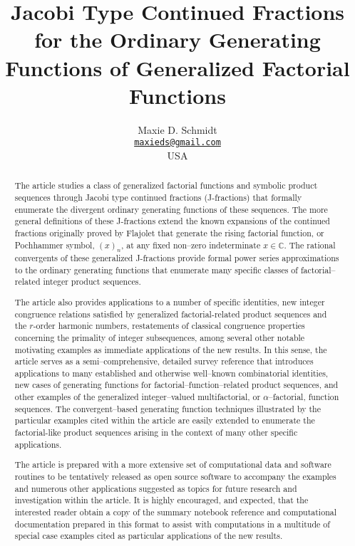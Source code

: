 \documentclass[12pt,reqno]{article}
\title{Jacobi Type Continued Fractions for the 
       Ordinary Generating Functions of 
       Generalized Factorial Functions}
\author{Maxie D. Schmidt \\ 
        \href{mailto:maxieds@gmail.com}{\nolinkurl{maxieds@gmail.com}} \\
        USA}
\date{}
\numberwithin{sfootnote}{section}
\numberwithin{equation}{section}
\theoremstyle{plain}
\theoremstyle{definition}
\theoremstyle{remark}
\begin{document}
\maketitle

\begin{abstract} 
The article studies a class of generalized factorial functions 
and symbolic product sequences 
through Jacobi type continued fractions (J-fractions) that 
formally enumerate the divergent ordinary generating functions of 
these sequences. 
The more general definitions of 
these J-fractions extend the known expansions of the 
continued fractions originally proved by Flajolet 
that generate the rising factorial function, or 
Pochhammer symbol, $(x)_n$, at any fixed non--zero 
indeterminate $x \in \mathbb{C}$. 
The rational convergents of these generalized J-fractions 
provide formal power series approximations to the 
ordinary generating functions that enumerate many specific classes of 
factorial--related integer product sequences. 

The article also provides applications to a number of specific identities, 
new integer congruence relations satisfied by 
generalized factorial-related product sequences and the 
$r$-order harmonic numbers, 
restatements of classical congruence properties concerning the 
primality of integer subsequences, among several other notable 
motivating examples as immediate applications of the new results. 
In this sense, the article serves as a 
semi--comprehensive, detailed survey reference that 
introduces applications to many established and 
otherwise well--known combinatorial identities, 
new cases of generating functions for factorial--function--related 
product sequences, and other examples of the generalized 
integer--valued multifactorial, or $\alpha$--factorial, function sequences. 
The convergent--based generating function techniques illustrated by the 
particular examples cited within the article 
are easily extended to enumerate the 
factorial-like product sequences arising in the context of 
many other specific applications. 

The article is prepared with a more extensive set of 
computational data and software routines to be tentatively 
released as open source software to accompany the examples and 
numerous other applications suggested as topics for future 
research and investigation within the article. 
It is highly encouraged, and expected, that the 
interested reader obtain a copy of the summary notebook reference and 
computational documentation prepared in this format to 
assist with computations in a multitude of special case examples cited as 
particular applications of the new results. 
\end{abstract} 
\end{document}
